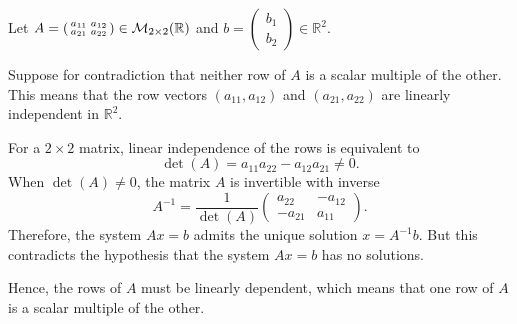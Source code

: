 \begin{exercisesolution}
\label{sol:inconsistent_2x2_system}

Let $A = \left(\begin{smallmatrix} a_{11} & a_{12} \\ a_{21} & a_{22} \end{smallmatrix}\right) \in \mathcal{M}_{2 \times 2}(\mathbb{R})$ and $b = \left(\begin{smallmatrix} b_1 \\ b_2 \end{smallmatrix}\right) \in \mathbb{R}^2$.

Suppose for contradiction that neither row of $A$ is a scalar multiple of the other. This means that the row vectors $(a_{11}, a_{12})$ and $(a_{21}, a_{22})$ are linearly independent in $\mathbb{R}^2$. 

For a $2 \times 2$ matrix, linear independence of the rows is equivalent to
\[
\det(A) = a_{11}a_{22} - a_{12}a_{21} \ne 0.
\]
When $\det(A) \ne 0$, the matrix $A$ is invertible with inverse
\[
A^{-1} = \frac{1}{\det(A)} \begin{pmatrix} a_{22} & -a_{12} \\ -a_{21} & a_{11} \end{pmatrix}.
\]
Therefore, the system $Ax = b$ admits the unique solution $x = A^{-1}b$. But this contradicts the hypothesis that the system $Ax = b$ has no solutions.

Hence, the rows of $A$ must be linearly dependent, which means that one row of $A$ is a scalar multiple of the other.


\end{exercisesolution}
